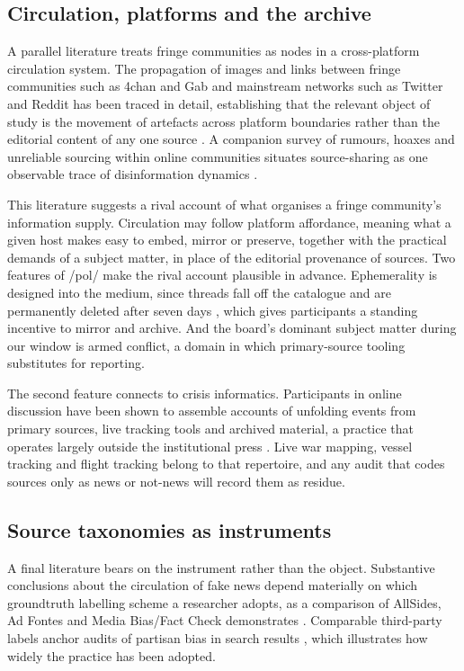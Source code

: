 \documentclass[11pt]{article}
\begin{document}
\subsection{Circulation, platforms and the archive}

A parallel literature treats fringe communities as nodes in a cross-platform
circulation system. The propagation of images and links between fringe
communities such as 4chan and Gab and mainstream networks such as Twitter and
Reddit has been traced in detail, establishing that the relevant object of study
is the movement of artefacts across platform boundaries rather than the
editorial content of any one source \citep{zannettou2018memes}. A companion
survey of rumours, hoaxes and unreliable sourcing within online communities
situates source-sharing as one observable trace of disinformation dynamics
\citep{zannettou2019web}.

This literature suggests a rival account of what organises a fringe community's
information supply. Circulation may follow platform affordance, meaning what a
given host makes easy to embed, mirror or preserve, together with the practical
demands of a subject matter, in place of the editorial provenance of sources.
Two features of /pol/ make the rival account plausible in advance. Ephemerality
is designed into the medium, since threads fall off the catalogue and are
permanently deleted after seven days \citep{papasavva2020}, which gives
participants a standing incentive to mirror and archive. And the board's
dominant subject matter during our window is armed conflict, a domain in which
primary-source tooling substitutes for reporting.

The second feature connects to crisis informatics. Participants in online
discussion have been shown to assemble accounts of unfolding events from primary
sources, live tracking tools and archived material, a practice that operates
largely outside the institutional press \citep{starbird2014}. Live war mapping, vessel
tracking and flight tracking belong to that repertoire, and any audit that codes
sources only as news or not-news will record them as residue.

\subsection{Source taxonomies as instruments}

A final literature bears on the instrument rather than the object.
Substantive conclusions about the circulation of fake news depend materially on
which groundtruth labelling scheme a researcher adopts, as a comparison of
AllSides, Ad Fontes and Media Bias/Fact Check demonstrates \citep{bozarth2020}.
Comparable third-party labels anchor audits of partisan bias in search results
\citep{robertson2018}, which illustrates how widely the practice has been
adopted.
\end{document}
